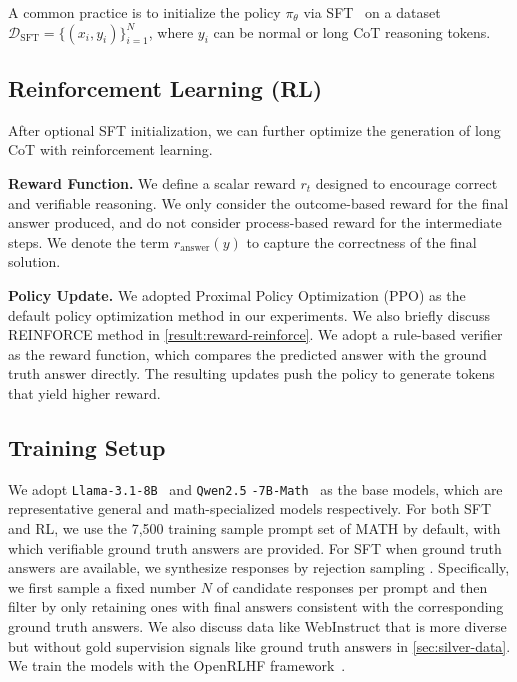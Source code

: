 A common practice is to initialize the policy \(\pi_\theta\) via SFT~\citep{lamb2016professorforcing} on a dataset \(\mathcal{D}_{\text{SFT}} = \{(x_i, y_i)\}_{i=1}^N\), where \(y_i\) can be normal or long CoT reasoning tokens. 


\subsection{Reinforcement Learning (RL)}
\label{sec:rl-formulation}

After optional SFT initialization, we can further optimize the generation of long CoT with reinforcement learning.

\noindent\textbf{Reward Function.} 
We define a scalar reward \(r_t\) designed to encourage correct and verifiable reasoning. We only consider the outcome-based reward for the final answer produced, and do not consider process-based reward for the intermediate steps. We denote
the term \(r_{\text{answer}}(y)\) to capture the correctness of the final solution.

\noindent\textbf{Policy Update.} We adopted Proximal Policy Optimization (PPO) \citep{schulman2017ppo} as the default policy optimization method in our experiments. We also briefly discuss
REINFORCE \citep{sutton2018reinforce} method in \autoref{result:reward-reinforce}. We adopt a rule-based verifier as the reward function, which compares the predicted answer with the ground truth answer directly. The resulting updates push the policy to generate tokens that yield higher reward. 


\subsection{Training Setup}

We adopt \texttt{Llama-3.1-8B}~\cite{meta2023llama3} and \texttt{Qwen2.5} \texttt{-7B-Math}~\cite{qwen2024qwen25math} as the base models, which are representative general and math-specialized models respectively. For both SFT and RL, we use the 7,500 training sample prompt set of MATH \citep{hendrycks2021math} by default, with which verifiable ground truth answers are provided. For SFT when ground truth answers are available, we synthesize responses by rejection sampling \citep{zelikman2022star, dong2023raft, yuan2023rft, gulcehre2023rest, singh2023restem,yue2024mammoth, tong2024dartmath}. Specifically, we first sample a fixed number $N$ of candidate responses per prompt and then filter by only retaining ones with final answers consistent with the corresponding ground truth answers. We also discuss data like WebInstruct \cite{yue2024mammoth2} that is more diverse but without gold supervision signals like ground truth answers in \textsection\ref{sec:silver-data}. We train the models with the OpenRLHF framework~\cite{hu2024openrlhfeasytousescalablehighperformance}. 


